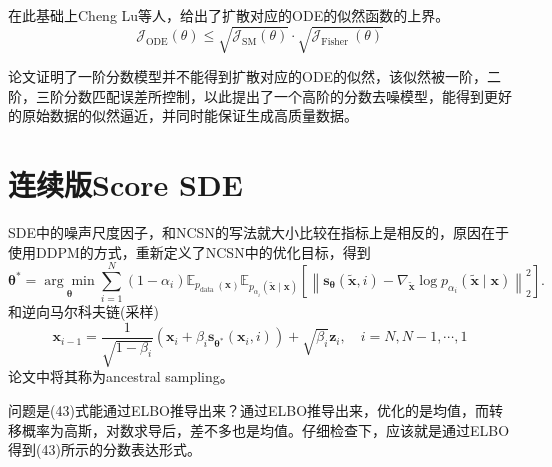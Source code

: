 \documentclass[lang=cn,newtx,10pt,scheme=chinese]{elegantbook}
\begin{document}
在此基础上Cheng Lu等人，给出了扩散对应的ODE的似然函数的上界。
\begin{equation}
\mathcal{J}_{\mathrm{ODE}}(\theta) \leq \sqrt{\mathcal{J}_{\mathrm{SM}}(\theta)} \cdot \sqrt{\mathcal{J}_{\text {Fisher }}(\theta)}
\end{equation}

论文证明了一阶分数模型并不能得到扩散对应的ODE的似然，该似然被一阶，二阶，三阶分数匹配误差所控制，以此提出了一个高阶的分数去噪模型，能得到更好的原始数据的似然逼近，并同时能保证生成高质量数据。

\section{连续版Score SDE}
SDE中的噪声尺度因子，和NCSN的写法就大小比较在指标上是相反的，原因在于使用DDPM的方式，重新定义了NCSN中的优化目标，得到
\begin{equation}
\boldsymbol{\theta}^*=\underset{\boldsymbol{\theta}}{\arg \min } \sum_{i=1}^N\left(1-\alpha_i\right) \mathbb{E}_{p_{\text {data }}(\mathbf{x})} \mathbb{E}_{p_{\alpha_i}(\tilde{\mathbf{x}} \mid \mathbf{x})}\left[\left\|\mathbf{s}_{\boldsymbol{\theta}}(\tilde{\mathbf{x}}, i)-\nabla_{\tilde{\mathbf{x}}} \log p_{\alpha_i}(\tilde{\mathbf{x}} \mid \mathbf{x})\right\|_2^2\right] .
\end{equation}
和逆向马尔科夫链(采样)
\begin{equation}
\mathbf{x}_{i-1}=\frac{1}{\sqrt{1-\beta_i}}\left(\mathbf{x}_i+\beta_i \mathbf{s}_{\boldsymbol{\theta}^*}\left(\mathbf{x}_i, i\right)\right)+\sqrt{\beta_i} \mathbf{z}_i, \quad i=N, N-1, \cdots, 1
\end{equation}
论文中将其称为ancestral sampling。

问题是(43)式能通过ELBO推导出来？通过ELBO推导出来，优化的是均值，而转移概率为高斯，对数求导后，差不多也是均值。仔细检查下，应该就是通过ELBO得到(43)所示的分数表达形式。
\end{document}
